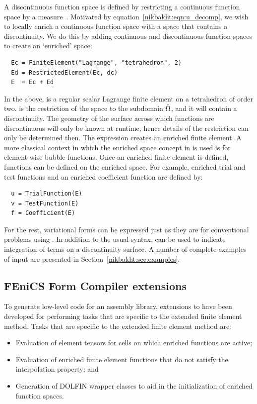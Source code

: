 A discontinuous function space is defined by restricting a
continuous function space by a measure~. Motivated by
equation~\eqref{nikbakht:eqn:u_decomp}, we wish to locally enrich a continuous
function space with a space that contains a discontinuity. We do this
by adding continuous and discontinuous function spaces to create an
`enriched' space:
%
\begin{center}
\small
\begin{verbatim}
  Ec = FiniteElement("Lagrange", "tetrahedron", 2)
  Ed = RestrictedElement(Ec, dc)
  E  = Ec + Ed
\end{verbatim}
\end{center}
%
In the above,  is a regular scalar Lagrange finite element
on a tetrahedron of order two.  is the restriction of the
space  to the subdomain $\Hat{\Omega}$, and it will contain
a discontinuity. The geometry of the surface across which functions
are discontinuous will only be known at runtime, hence details of the
restriction can only be determined then. The expression  creates an enriched finite element. A more classical context in
which the enriched space concept in \ufl{} is used is for element-wise
bubble functions.  Once an enriched finite element is defined, functions
can be defined on the enriched space. For example, enriched trial and test
functions and an enriched coefficient function are defined by:
{ \small
\begin{verbatim}
  u = TrialFunction(E)
  v = TestFunction(E)
  f = Coefficient(E)
\end{verbatim}
}
%
For the rest, variational forms can be expressed just as they are for
conventional problems using \ufl{}. In addition to the usual \ufl{}
syntax,  can be used to indicate integration of terms on a
discontinuity surface.  A number of complete examples of \ufl{} input
are presented in Section~\ref{nikbakht:sec:examples}.
\subsection{FEniCS Form Compiler extensions}

To generate low-level code for an assembly library, extensions to \ffc{}
have been developed for performing tasks that are specific to the extended
finite element method.  Tasks that are specific to the extended finite
element method are:
%
\begin{itemize}
  \item Evaluation of element tensors for cells on which enriched
  functions are active;
  \item Evaluation of enriched finite element functions that do not
  satisfy the interpolation property; and
  \item Generation of DOLFIN wrapper classes
  to aid in the initialization of enriched function spaces.
\end{itemize}
